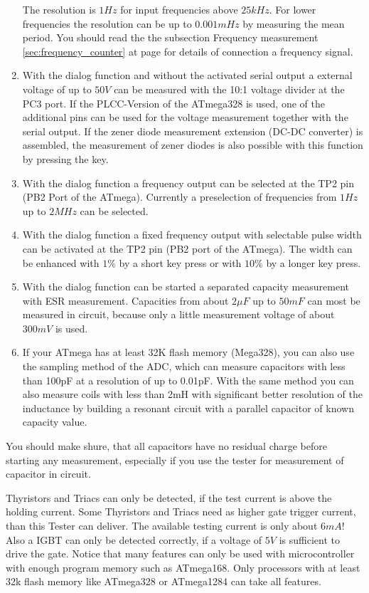 \begin{enumerate}
The resolution is \(1Hz\) for input frequencies above \(25kHz\).
For lower frequencies the resolution can be up to \(0.001mHz\) by measuring the mean period.
You should read the the subsection Frequency measurement \ref{sec:frequency_counter} at page \pageref{sec:frequency_counter} 
for details of connection a frequency signal.
\item With the dialog function and without the activated serial output a external voltage of up to \(50V\) can be measured with
the 10:1 voltage divider at the PC3 port. If the PLCC-Version of the ATmega328 is used, one of the additional
pins can be used for the voltage measurement together with the serial output.
If the zener diode measurement extension (DC-DC converter) is assembled, the measurement of
zener diodes is also possible with this function by pressing the key.
\item With the dialog function a frequency output can be selected at the TP2 pin (PB2 Port of the ATmega).
Currently a preselection of frequencies from \(1Hz\) up to \(2MHz\) can be selected.
\item With the dialog function a fixed frequency output with selectable pulse width can be activated at the TP2 pin
(PB2 port of the ATmega). The width can be enhanced with \(1\%\) by a short key press or with \(10\%\) by a longer key press.
\item With the dialog function can be started a separated capacity measurement with ESR measurement.
Capacities from about \(2\mu F\) up to \(50mF\) can most be measured in circuit, because only a little
measurement voltage of about \(300mV\) is used.
\item If your ATmega has at least 32K flash memory (Mega328), you can also use the sampling method of the ADC,
which can measure capacitors with less than 100pF at a resolution of up to 0.01pF.
With the same method you can also measure coils with less than 2mH with significant better resolution of the inductance
by building a resonant circuit with a parallel capacitor of known capacity value.

\end{enumerate}

You should make shure, that all capacitors have no residual charge before starting any measurement,
especially if you use the tester for measurement of capacitor in circuit.


Thyristors and Triacs can only be detected, if the test current is above the holding current.
Some Thyristors and Triacs need as higher gate trigger current, than this Tester can deliver.
The available testing current is only about \(6mA\)!
Also a IGBT can only be detected correctly, if a voltage of \(5V\) is sufficient to drive the gate.
Notice that many features can only be used with microcontroller with enough program memory such as ATmega168.
Only processors with at least 32k flash memory like ATmega328 or ATmega1284 can take all features.

